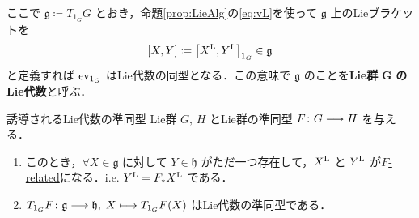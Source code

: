 \documentclass[TQFT_main]{subfiles}
\begin{document}
ここで $\bm{\mathfrak{g}} \coloneqq T_{1_G} G$ とおき，命題\ref{prop:LieAlg}の\eqref{eq:vL}を使って $\mathfrak{g}$ 上のLieブラケットを
\begin{align}
    \comm{X}{Y} \coloneqq \comm{\Lie{X}}{\Lie{Y}}_{1_G} \in \mathfrak{g}
\end{align}
と定義すれば $\mathrm{ev}_{1_G}$ はLie代数の同型となる．この意味で $\mathfrak{g}$ のことを\textbf{Lie群} $\bm{G}$ \textbf{のLie代数}と呼ぶ．

\begin{mytheo}[label=thm:induced-LieAlg-hom]{誘導されるLie代数の準同型}
    Lie群 $G,\, H$ とLie群の準同型 $F \colon G \longrightarrow H$ を与える．
    \begin{enumerate}
        \item このとき，$\forall X \in \mathfrak{g}$ に対して $Y \in \mathfrak{h}$ がただ一つ存在して，$X^{\mathrm{L}}$ と $Y^{\mathrm{L}}$ が\hyperref[def:F-related]{$F$-related}になる．i.e. $Y^{\mathrm{L}} = F_* X^{\mathrm{L}}$ である．
        \item $T_{1_G} F \colon \mathfrak{g} \longrightarrow \mathfrak{h},\; X \longmapsto T_{1_G}F(X)$ はLie代数の準同型である．
    \end{enumerate}
\end{mytheo}
\end{document}
